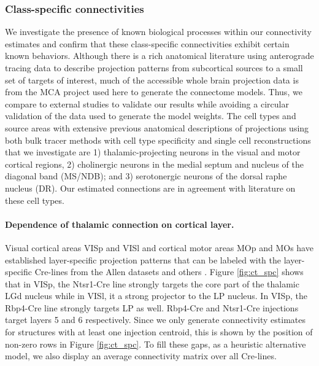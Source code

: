\newpage
\subsubsection{Class-specific connectivities}
\label{sec:class-specific-connectivities}
We investigate the presence of known biological processes within our connectivity estimates and confirm that these class-specific connectivities exhibit certain known behaviors.
Although there is a rich anatomical literature using anterograde tracing data to describe projection patterns from subcortical sources to a small set of targets of interest, much of the accessible whole brain projection data is from the MCA project used here to generate the connectome models.
Thus, we compare to external studies to validate our results while avoiding a circular validation of the data used to generate the model weights.
The cell types and source areas with extensive previous anatomical descriptions of projections using both bulk tracer methods with cell type specificity and single cell reconstructions that we investigate are 1) thalamic-projecting neurons in the visual and motor cortical regions, 2) cholinergic neurons in the medial septum and nucleus of the diagonal band (MS/NDB);
and 3) serotonergic neurons of the dorsal raphe nucleus (DR).
Our estimated connections are in agreement with literature on these cell types.

\paragraph{Dependence of thalamic connection on cortical layer.}

Visual cortical areas VISp and VISl and cortical motor areas MOp and MOs have established layer-specific projection patterns that can be labeled with the layer-specific Cre-lines from the Allen datasets and others \citep{Jeong2016-dc, Harris2019-mr}.
Figure \ref{fig:ct_spc} shows that in VISp, the Ntsr1-Cre line strongly targets the core part of the thalamic LGd nucleus while in VISl, it a strong projector to the LP nucleus.
In VISp, the Rbp4-Cre line strongly targets LP as well.  
Rbp4-Cre and Ntsr1-Cre injections target layers 5 and 6 respectively.
Since we only generate connectivity estimates for structures with at least one injection centroid, this is shown by the position of non-zero rows in Figure \ref{fig:ct_spc}.
To fill these gaps, as a heuristic alternative model, we also display an average connectivity matrix over all Cre-lines.

